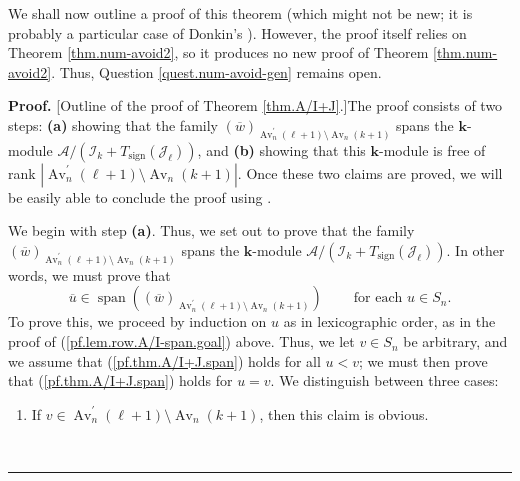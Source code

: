 \documentclass[numbers=enddot,12pt,final,onecolumn,notitlepage]{scrartcl}%
\numberwithin{exer}{subsection}
\theoremstyle{definition}
\newenvironment{proof}[1][Proof]{\noindent\textbf{#1.} }{\ \rule{0.5em}{0.5em}}
\begin{document}
We shall now outline a proof of this theorem (which might not be new; it is
probably a particular case of Donkin's \cite[Corollary 2.12]{Donkin24}).
However, the proof itself relies on Theorem \ref{thm.num-avoid2}, so it
produces no new proof of Theorem \ref{thm.num-avoid2}. Thus, Question
\ref{quest.num-avoid-gen} remains open.

\begin{proof}
[Outline of the proof of Theorem \ref{thm.A/I+J}.]The proof consists of two
steps: \textbf{(a)} showing that the family $\left(  \overline{w}\right)
_{\operatorname*{Av}\nolimits_{n}^{\prime}\left(  \ell+1\right)
\setminus\operatorname*{Av}\nolimits_{n}\left(  k+1\right)  }$ spans the
$\mathbf{k}$-module $\mathcal{A}/\left(  \mathcal{I}_{k}%
+T_{\operatorname*{sign}}\left(  \mathcal{J}_{\ell}\right)  \right)  $, and
\textbf{(b)} showing that this $\mathbf{k}$-module is free of rank $\left\vert
\operatorname*{Av}\nolimits_{n}^{\prime}\left(  \ell+1\right)  \setminus
\operatorname*{Av}\nolimits_{n}\left(  k+1\right)  \right\vert $. Once these
two claims are proved, we will be easily able to conclude the proof using
\cite[Lemma 5.21.9]{sga}.

We begin with step \textbf{(a)}. Thus, we set out to prove that the family
$\left(  \overline{w}\right)  _{\operatorname*{Av}\nolimits_{n}^{\prime
}\left(  \ell+1\right)  \setminus\operatorname*{Av}\nolimits_{n}\left(
k+1\right)  }$ spans the $\mathbf{k}$-module $\mathcal{A}/\left(
\mathcal{I}_{k}+T_{\operatorname*{sign}}\left(  \mathcal{J}_{\ell}\right)
\right)  $. In other words, we must prove that%
\begin{equation}
\overline{u}\in\operatorname*{span}\left(  \left(  \overline{w}\right)
_{\operatorname*{Av}\nolimits_{n}^{\prime}\left(  \ell+1\right)
\setminus\operatorname*{Av}\nolimits_{n}\left(  k+1\right)  }\right)
\ \ \ \ \ \ \ \ \ \ \text{for each }u\in S_{n}. \label{pf.thm.A/I+J.span}%
\end{equation}
To prove this, we proceed by induction on $u$ as in lexicographic order, as in
the proof of (\ref{pf.lem.row.A/I-span.goal}) above. Thus, we let $v\in S_{n}$
be arbitrary, and we assume that (\ref{pf.thm.A/I+J.span}) holds for all
$u<v$; we must then prove that (\ref{pf.thm.A/I+J.span}) holds for $u=v$. We
distinguish between three cases:

\begin{enumerate}
\item If $v\in\operatorname*{Av}\nolimits_{n}^{\prime}\left(  \ell+1\right)
\setminus\operatorname*{Av}\nolimits_{n}\left(  k+1\right)  $, then this claim
is obvious.


\end{enumerate}
\end{proof}
\end{document}
